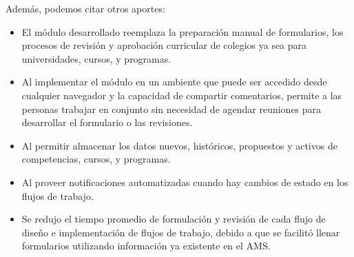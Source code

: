 Además, podemos citar otros aportes:
\begin{itemize}
	\item El módulo desarrollado reemplaza la preparación manual de formularios, los procesos de revisión y aprobación curricular de colegios ya sea para universidades, cursos, y programas.
	\item Al implementar el módulo en un ambiente que puede ser accedido desde cualquier navegador y la capacidad de compartir comentarios, permite a las personas trabajar en conjunto sin necesidad de agendar reuniones para desarrollar el formulario o las revisiones.
	\item Al permitir almacenar los datos nuevos, históricos, propuestos y activos de competencias, cursos, y programas.
	\item Al proveer notificaciones automatizadas cuando hay cambios de estado en los flujos de trabajo.
	\item Se redujo el tiempo promedio de formulación y revisión de cada flujo de diseño e implementación de flujos de trabajo, debido a que se facilitó llenar formularios utilizando información ya existente en el AMS.
\end{itemize}


